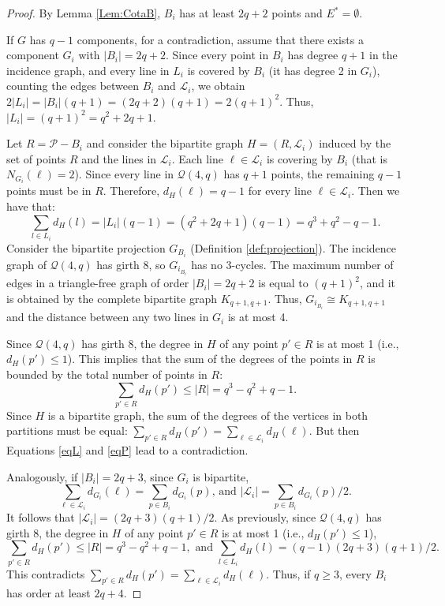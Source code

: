 \documentclass[10pt,a4paper]{amsart}
\begin{document}
\begin{proof}
     By Lemma \ref{Lem:CotaB}, $B_i$ has at least $2q+2$ points and $E^*=\emptyset$.
     
     If $G$ has $q-1$ components, for a contradiction, assume that there exists a component $G_i$ with $|B_i| = 2q + 2$. 
    Since every point in $B_i$ has degree $q+1$ in the incidence graph, and every line in $L_i$ is covered by $B_i$ (it has degree 2 in $G_i$), counting the edges between $B_i$ and $\mathcal{L}_i$, we obtain $2|L_i| = |B_i|(q+1) = (2q+2)(q+1) = 2(q+1)^2$. Thus, $|L_i| = (q+1)^2 = q^2 + 2q + 1$.
    
Let $R=\mathcal{P}-B_i$ and consider the bipartite graph $H = (R, \mathcal{L}_i)$ induced by the set of points $R$ and the lines in $\mathcal{L}_i$. 
Each line $\ell \in \mathcal{L}_i$ is covering by $B_i$ (that is $N_{G_i}(\ell)=2$). Since every line in $\mathcal{Q}(4,q)$ has $q+1$ points, the remaining $q-1$ points must be in $R$. Therefore, $d_H(\ell) = q - 1$ for every line $\ell \in \mathcal{L}_i$. Then we have that:  
\begin{equation}\label{eqL}
 \sum_{l \in L_i} d_H(l) = |L_i|(q - 1) = (q^2 + 2q + 1)(q - 1) = q^3 + q^2 - q - 1.
\end{equation}
Consider the bipartite projection $G_{B_i}$ (Definition \ref{def:projection}). The incidence graph of $\mathcal{Q}(4,q)$ has girth 8, so $G_{i_{B_i}}$ has no 3-cycles. The maximum number of edges in a triangle-free graph of order $|B_i|=2q+2$ is equal to $(q+1)^2$, and it is obtained by the complete bipartite graph $K_{q+1,q+1}$. Thus, $G_{i_{B_i}}\cong K_{q+1,q+1}$ and the distance between any two lines in $G_i$ is at most 4. 

Since $\mathcal{Q}(4,q)$ has girth 8, the degree in $H$ of any point $p' \in R$ is at most 1 (i.e., $d_H(p') \le 1$). This implies that the sum of the degrees of the points in $R$ is bounded by the total number of points in $R$:
\begin{equation}\label{eqP}
    \sum_{p' \in R} d_H(p') \le |R|  = q^3 - q^2 + q - 1. 
\end{equation}
Since $H$ is a bipartite graph, the sum of the degrees of the vertices in both partitions must be equal:
$\sum_{p' \in R} d_H(p') = \sum_{\ell \in \mathcal{L}_i} d_H(\ell)$. But then Equations \ref{eqL} and \ref{eqP} lead to a contradiction.

Analogously, if $|B_i|=2q+3$, since $G_i$ is bipartite,  $$\sum_{\ell\in\mathcal{L}_i} d_{G_i}(\ell)= \sum_{p\in B_i} d_{G_i}(p) \mbox{, and } |\mathcal{L}_i|=\sum_{p\in B_i} d_{G_i}(p)/2.$$ 
It follows that $|\mathcal{L}_i|=(2q+3)(q+1)/2$.
As previously, since $\mathcal{Q}(4,q)$ has girth 8, the degree in $H$ of any point $p' \in R$ is at most 1 (i.e., $d_H(p') \le 1$),
$$ \sum_{p' \in R} d_H(p') \le |R|  = q^3 - q^2 + q - 1,\text{ and }
\sum_{l \in L_i} d_H(l) = (q - 1)(2q+3)(q+1)/2.$$
This contradicts $ \sum_{p' \in R} d_H(p') = \sum_{\ell \in \mathcal{L}_i} d_H(\ell) $.
Thus, if $q\ge3$, every $B_i$ has order at least $2q+4$.
\end{proof}
\end{document}

